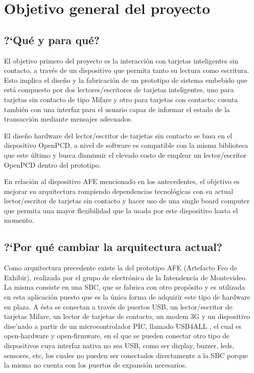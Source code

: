 \chapter{Objetivo general del proyecto}

\section{?`Qu\'e y para qu\'e?}

El objetivo primero del proyecto es la interacción con tarjetas inteligentes sin contacto, 
a través de un dispositivo que permita tanto su lectura como escritura.
Esto implica el diseño y la fabricación de un prototipo de sistema embebido
que está compuesto por dos lectores/escritores de tarjetas inteligentes, uno para tarjetas
sin contacto de tipo Mifare y otro para tarjetas con contacto; cuenta también con una
interfaz para el usuario capaz de informar el estado de la transacción mediante mensajes adecuados.

El diseño hardware del lector/escritor de tarjetas sin contacto se basa en el dispositivo
OpenPCD, a nivel de software es compatible con la misma biblioteca que este último y busca
disminuir el elevado costo de emplear un lector/escritor OpenPCD dentro del prototipo.

En relación al dispositivo AFE mencionado en los antecedentes, el objetivo es mejorar
su arquitectura rompiendo dependencias tecnológicas con su actual lector/escritor de
tarjetas sin contacto y hacer uso de una single board computer que permita una mayor
flexibilidad que la usada por este dispositivo hasta el momento.


\section{?`Por qu\'e cambiar la arquitectura actual?}

Como arquitectura precedente existe la del prototipo AFE (Artefacto Feo de Exhibir), realizada por el grupo de electr\'onica de la Intendencia de Montevideo. La misma consiste en una SBC, que se fabrica con otro prop\'osito y es utilizada en esta aplicaci\'on puesto que es la \'unica forma de adquirir este tipo de hardware en plaza. A \'esta se conectan a trav\'es de puertos USB, un lector/escritor de tarjetas Mifare, un lector de tarjetas de contacto, un modem 3G y un dispositivo dise'nado a partir de un microcontrolador PIC, llamado USB4ALL \cite{usb4all}, el cual es open-hardware y open-firmware, en el que se pueden conectar otro tipo de dispositivos cuya interfaz nativa no sea USB, como ser display, buzzer, leds, sensores, etc, los cuales no pueden ser conectados directamente a la SBC porque la misma no cuenta con los puertos de expansi\'on necesarios.

